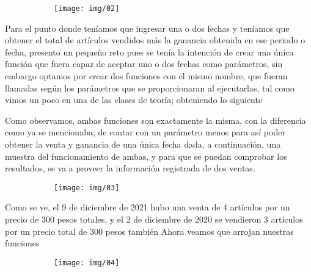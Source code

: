 \documentclass[letterpaper,12pt]{article}
\begin{document}
	\begin{figure}[H]

		\begin{subfigure}{20cm}

			\centering

			\texttt{[image: img/02]}

		\end{subfigure}

	\end{figure}
	
	Para el punto donde teníamos que ingresar una o dos fechas y teníamos que obtener el total de artículos vendidos más la ganancia obtenida en ese periodo o fecha, presento un pequeño reto pues se tenía la intención de crear una única función que fuera capaz de aceptar uno o dos fechas como parámetros, sin embargo optamos  por crear dos funciones con el mismo nombre, que fueran llamadas según los parámetros que se proporcionaran al ejecutarlas, tal como vimos un poco en una de las clases de teoría; obteniendo lo siguiente
	
	
	
	Como observamos, ambas funciones son exactamente la misma, con la diferencia como ya se mencionaba, de contar con un parámetro menos para así poder obtener la venta y ganancia de una única fecha dada, a continuación, una muestra del funcionamiento de ambas, y para que se puedan comprobar los resultados, se va a proveer la información registrada de dos ventas.
	
	
	\begin{figure}[H]

		\begin{subfigure}{20cm}

			\centering

			\texttt{[image: img/03]}

		\end{subfigure}

	\end{figure}

	Como se ve, el 9 de diciembre de 2021 hubo una venta de 4 artículos por un precio de 300 pesos totales, y el 2 de diciembre de 2020 se vendieron 3 artículos por un precio total de 300 pesos también
	Ahora veamos que arrojan nuestras funciones
	
	\begin{figure}[H]

		\begin{subfigure}{20cm}

			\centering

			\texttt{[image: img/04]}

		\end{subfigure}

	\end{figure}
	
\end{document}
